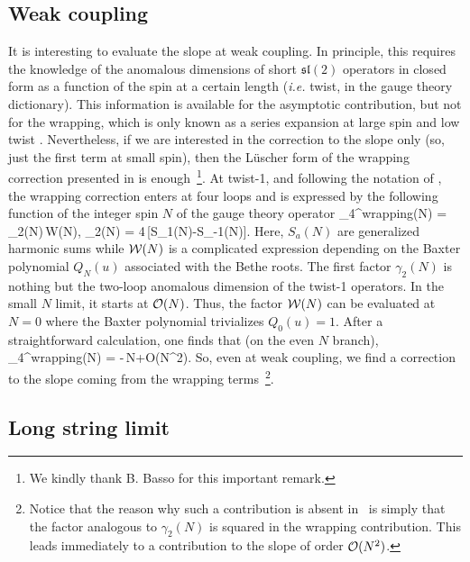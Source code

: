 \subsection{Weak coupling}

It is interesting to evaluate the slope at weak coupling.
 In principle, this  requires the knowledge of the anomalous dimensions of 
short $\mathfrak{sl}(2)$ operators in closed form as a function of the spin at a certain length ({\em i.e.} twist, in the gauge theory
dictionary). This information is 
available for the asymptotic contribution, but not for the wrapping, which is only known as a series expansion 
at large spin and low twist \cite{Beccaria:2009ny,Beccaria:2010kd}.
 Nevertheless, if we are interested in the correction to the slope only (so, just the first term at small spin), then the L\"uscher form of the wrapping correction
presented in \cite{Beccaria:2009ny} is enough~\footnote{We kindly thank B. Basso for this important remark.}. 
At twist-1, and following the notation of \cite{Beccaria:2009ny}, the wrapping correction enters at four loops
and is expressed by the following function of the integer spin $N$ of the gauge theory operator
\beq
\gamma_{4}^{\rm wrapping}(N) = \gamma_{2}(N)\,\mc W(N),
\qquad \gamma_{2}(N) = 4\,[S_{1}(N)-S_{-1}(N)].
\eeq
Here, $S_{a}(N)$ are generalized harmonic sums while $\mathcal W(N)$ is a complicated expression depending on the 
Baxter polynomial $Q_{N}(u)$ associated with the Bethe roots. The first factor $\gamma_{2}(N)$ 
is nothing but the two-loop
anomalous dimension of the twist-1 operators. In the small $N$ limit, it starts at $\mathcal O(N)$. Thus, the 
factor $\mathcal W(N)$ can be evaluated at $N=0$ where the Baxter polynomial trivializes $Q_{0}(u)=1$.
After a straightforward calculation, one finds that (on the even $N$ branch),
\beq
\gamma_{4}^{\rm wrapping}(N) = -\,N+\mc O(N^{2}).
\eeq
So, even at weak coupling, we find a correction to the slope coming from the wrapping 
terms~\footnote{Notice that 
the reason why such a contribution is absent in \ads\ is simply that the factor analogous to $\gamma_{2}(N)$
is squared in the wrapping contribution. This leads immediately to a contribution to the slope of order $\mathcal O(N^{2})$.}.


\subsection{Long string limit}


